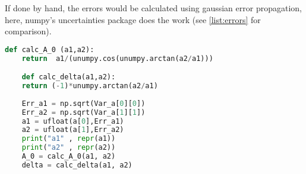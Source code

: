 If done by hand, the errors would be calculated using gaussian error propagation, here, numpy's uncertainties package does the work (see \autoref{list:errors} for comparison).

\begin{lstlisting}[language = Python, caption={Calculation of errors of $a_1, a_2, A_0$ and $\delta$.}, label = {list:errors}]
    def calc_A_0 (a1,a2):
    return  a1/(unumpy.cos(unumpy.arctan(a2/a1)))

    def calc_delta(a1,a2):
    return (-1)*unumpy.arctan(a2/a1)
    
    Err_a1 = np.sqrt(Var_a[0][0])
    Err_a2 = np.sqrt(Var_a[1][1])
    a1 = ufloat(a[0],Err_a1)
    a2 = ufloat(a[1],Err_a2)
    print("a1" , repr(a1))
    print("a2" , repr(a2))
    A_0 = calc_A_0(a1, a2)
    delta = calc_delta(a1, a2)
\end{lstlisting}